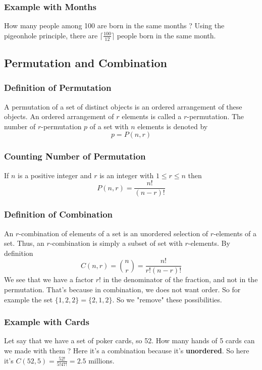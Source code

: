 \documentclass{article}
\begin{document}
\subsubsection{Example with Months} How many people among 100 are born in the same months ? Using the pigeonhole principle, there are $ \lceil \frac{100}{12} \rceil $ people born in the same month.

\subsection{Permutation and Combination}
\subsubsection{Definition of Permutation} A permutation of a set of distinct objects is an ordered arrangement of these objects. An ordered arrangement of $ r $ elements is called a $ r $-permutation. The number of $ r $-permutation $ p $ of a set with $ n $ elements is denoted by
\begin{equation}
p = P(n,r)
\end{equation}

\subsubsection{Counting Number of Permutation} If $ n $ is a positive integer and $ r $ is an integer with $ 1 \leq r \leq n $ then
\begin{equation}
P(n,r) = \frac{n!}{(n-r)!}
\end{equation} 

\subsubsection{Definition of Combination} An $ r $-combination of elements of a set is an unordered selection of $ r $-elements of a set. Thus, an $ r $-combination is simply a subset of set with $ r $-elements. By definition
\begin{equation}
C(n,r) = \binom{n}{r} = \frac{n!}{r!(n-r)!}
\end{equation}
We see that we have a factor $ r! $ in the denominator of the fraction, and not in the permutation. That's because in combination, we does not want order. So for example the set $ \{1,2,2\} = \{2,1,2\} $. So we "remove" these possibilities.

\subsubsection{Example with Cards} Let say that we have a set of poker cards, so 52. How many hands of 5 cards can we made with them ? Here it's a combination because it's \textbf{unordered}. So here it's $ C(52,5) = \frac{52!}{5!47!} = 2.5 $ millions.
\end{document}
